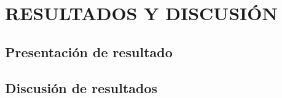 \section{RESULTADOS Y DISCUSIÓN}

\subsection{Presentación de resultado}

\subsection{Discusión de resultados}